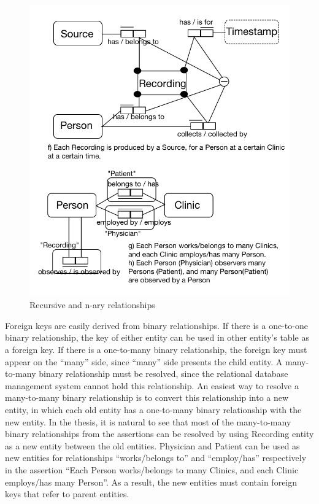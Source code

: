 \begin{figure}[ht]
    \centering
    \includegraphics[width=1.0\textwidth]{Figures/NaryAndRecursive.png}
    \caption{Recursive and n-ary relationships}
    \label{fig:Figures/NaryAndRecursive}
\end{figure}
Foreign keys are easily derived from binary relationships. If there is a one-to-one binary relationship, the key of either entity can be used in other entity’s table as a foreign key. If there is a one-to-many binary relationship, the foreign key must appear on the “many” side, since “many” side presents the child entity. A many-to-many binary relationship must be resolved, since the relational database management system cannot hold this relationship. An easiest way to resolve a many-to-many binary relationship is to convert this relationship into a new entity, in which each old entity has a one-to-many binary relationship with the new entity. In the thesis, it is natural to see that most of the many-to-many binary relationships from the assertions can be resolved by using Recording entity as a new entity between the old entities. Physician and Patient can be used as new entities for relationships “works/belongs to” and “employ/has” respectively in the assertion “Each Person works/belongs to many Clinics, and each Clinic employs/has many Person”. As a result, the new entities must contain foreign keys that refer to parent entities.\\
